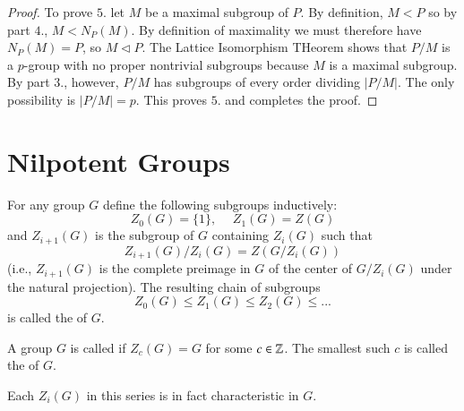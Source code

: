 \documentclass[12pt, a4paper, oneside, openright, titlepage]{book}
\begin{document}
\begin{proof}
    To prove $5.$ let $M$ be a maximal subgroup of $P$. By definition, $M < P$ so by part $4.$, $M < N_P(M)$. By definition of maximality we must therefore have $N_P(M) = P$, so $M \triangleleft P$. The Lattice Isomorphism THeorem shows that $P/M$ is a $p$-group with no proper nontrivial subgroups because $M$ is a maximal subgroup. By part $3.$, however, $P/M$ has subgroups of every order dividing $|P/M|$. The only possibility is $|P/M| = p$. This proves $5.$ and completes the proof.
\end{proof}


\section{\textsection Nilpotent Groups}

\begin{defn}
    For any group $G$ define the following subgroups inductively: \begin{equation*}
        Z_0(G) = \{1\}, \hspace{15pt} Z_1(G) = Z(G)
    \end{equation*}
    and $Z_{i+1}(G)$ is the subgroup of $G$ containing $Z_i(G)$ such that \begin{equation*}
        Z_{i+1}(G)/Z_i(G) = Z(G/Z_i(G))
    \end{equation*}
    (i.e., $Z_{i+1}(G)$ is the complete preimage in $G$ of the center of $G/Z_i(G)$ under the natural projection). The resulting chain of subgroups \begin{equation*}
        Z_0(G) \leq Z_1(G) \leq Z_2(G) \leq ...
    \end{equation*}
    is called the  of $G$.
\end{defn}


\begin{defn}
    A group $G$ is called  if $Z_c(G) = G$ for some $c \in \mathbb Z$. The smallest such $c$ is called the  of $G$.
\end{defn}


Each $Z_i(G)$ in this series is in fact characteristic in $G$.
\end{document}
